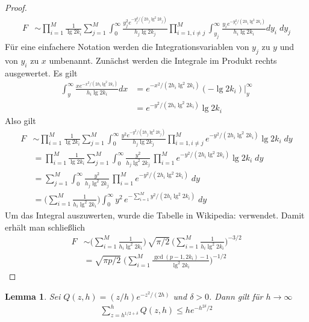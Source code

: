\documentclass[a4paper, 11pt, ngerman]{article}
\theoremstyle{definition}
\theoremstyle{plain}
\newtheorem{lemma}{Lemma}
\theoremstyle{remark}
\begin{document}
\begin{proof}
\begin{align*}
        F & \sim
        \prod_{i = 1}^M \frac 1 {\lg 2k_i}
        \sum_{j = 1}^M \int_0^\infty
        \frac {y_j^2 e^{-y_j^2 / (2h_j \lg^2 2k_j)}} {h_j \lg 2k_j}
        \prod_{i = 1, i \ne j}^M \int_{y_j}^{\infty}
        \frac {y_i e^{-y_i^2 / (2h_i \lg^2 2k_i)}} {h_i \lg 2k_i} dy_i \; dy_j
    \end{align*}
    Für eine einfachere Notation werden die Integrationsvariablen von $y_j$ zu $y$ und von $y_i$ zu $x$ umbenannt. Zunächst werden die Integrale im Produkt rechts ausgewertet. Es gilt
    \begin{align*}
        \int_{y}^{\infty}
        \frac {x e^{-x^2 / (2h_i \lg^2 2k_i)}} {h_i \lg 2k_i} dx
         & = e^{-x^2/(2h_i \lg^2 2k_i)} (- \lg 2k_i) \Big \vert_{y}^{\infty} \\
         & = e^{-y^2/(2h_i \lg^2 2k_i)} \lg 2k_i
    \end{align*}
    Also gilt
    \begin{align*}
        F & \sim
        \prod_{i = 1}^M \frac 1 {\lg 2k_i}
        \sum_{j = 1}^M \int_0^\infty
        \frac {y^2 e^{-y^2 / (2h_j \lg^2 2k_j)}} {h_j \lg 2k_j}
        \prod_{i = 1, i \ne j}^M e^{-y^2/(2h_i \lg^2 2k_i)} \lg 2k_i \; dy \\
          & = \prod_{i = 1}^M \frac 1 {\lg 2k_i}
        \sum_{j = 1}^M \int_0^\infty
        \frac {y^2} {h_j \lg^2 2k_j} \,
        \prod_{i = 1}^M e^{-y^2/(2h_i \lg^2 2k_i)} \lg 2k_i \; dy          \\
          & = \sum_{j = 1}^M \int_0^\infty
        \frac {y^2} {h_j \lg^2 2k_j} \,
        \prod_{i = 1}^M e^{-y^2/(2h_i \lg^2 2k_i)} \; dy                   \\
          & = \Bigg ( \sum_{i = 1}^M \frac 1 {h_i \lg^2 2k_i} \Bigg )
        \int_0^\infty
        y^2 \,e^{- \sum_{i = 1}^M y^2/(2h_i \lg^2 2k_i)} \; dy
    \end{align*}
    Um das Integral auszuwerten, wurde die Tabelle in Wikipedia: \cite{gint} verwendet. Damit erhält man schließlich
    \begin{align*}
        F & \sim \Bigg (\sum_{i = 1}^M \frac 1 {h_i \lg^2 2k_i} \Bigg ) \,
        \sqrt {\pi / 2} \
        \Bigg ( \sum_{i = 1}^M \frac 1 {h_i \lg^2 2k_i} \Bigg )^{-3/2}     \\
          & = \sqrt{\pi p / 2} \; \Bigg (
        \sum_{i = 1}^M \frac {\gcd(p - 1, 2k_i) - 1} {\lg^2 2k_i} \Bigg )^{-1/2}
    \end{align*}
\end{proof}

\begin{lemma}
    Sei $Q(z, h) = (z/h)e^{-z^2/(2h)}$ und $\delta > 0$. Dann gilt für $h \to \infty$
    \begin{align*}
        \sum_{z = h^{1/2 + \delta}}^h Q(z, h) \le he^{-h^{2\delta}/2}
    \end{align*}

    \label{lemma:q-large-z-asymp}
\end{lemma}
\end{document}

